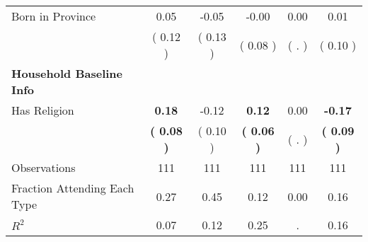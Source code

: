 \begin{table}[H]
{\begin{tabular}{lccccc}
\quad Born in Province &      0.05 &     -0.05 &     -0.00 &      0.00 &      0.01 \\
\quad  & (     0.12 ) & (     0.13 )  & (     0.08 )  & (        . ) & (     0.10 ) \\
\midrule
\textbf{Household Baseline Info} \\
\quad Has Religion & \textbf{     0.18} &     -0.12 & \textbf{     0.12} &      0.00 & \textbf{    -0.17} \\
\quad  & \textbf{(     0.08 )} & (     0.10 )  & \textbf{(     0.06 )}  & (        . ) & \textbf{(     0.09 )} \\
\midrule
Observations & 111 & 111 & 111 & 111 & 111 \\
Fraction Attending Each Type &      0.27 &      0.45 &      0.12 &      0.00 &      0.16 \\
\midrule
$ R^2$ &      0.07 &      0.12 &      0.25 &         . &      0.16 \\
\bottomrule
\end{tabular}}
\end{table}
